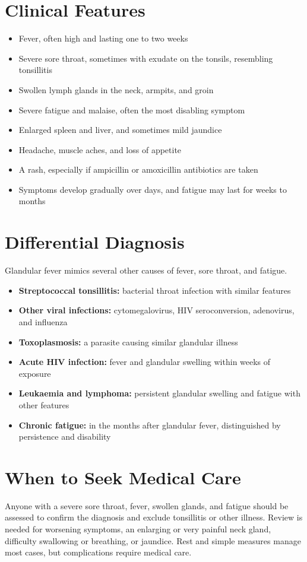\section*{Clinical Features}
\begin{itemize}
    \item Fever, often high and lasting one to two weeks
    \item Severe sore throat, sometimes with exudate on the tonsils, resembling tonsillitis
    \item Swollen lymph glands in the neck, armpits, and groin
    \item Severe fatigue and malaise, often the most disabling symptom
    \item Enlarged spleen and liver, and sometimes mild jaundice
    \item Headache, muscle aches, and loss of appetite
    \item A rash, especially if ampicillin or amoxicillin antibiotics are taken
    \item Symptoms develop gradually over days, and fatigue may last for weeks to months
\end{itemize}

\section*{Differential Diagnosis}
Glandular fever mimics several other causes of fever, sore throat, and fatigue.
\begin{itemize}
    \item \textbf{Streptococcal tonsillitis:} bacterial throat infection with similar features
    \item \textbf{Other viral infections:} cytomegalovirus, HIV seroconversion, adenovirus, and influenza
    \item \textbf{Toxoplasmosis:} a parasite causing similar glandular illness
    \item \textbf{Acute HIV infection:} fever and glandular swelling within weeks of exposure
    \item \textbf{Leukaemia and lymphoma:} persistent glandular swelling and fatigue with other features
    \item \textbf{Chronic fatigue:} in the months after glandular fever, distinguished by persistence and disability
\end{itemize}

\section*{When to Seek Medical Care}
Anyone with a severe sore throat, fever, swollen glands, and fatigue should be assessed to confirm the diagnosis and exclude tonsillitis or other illness. Review is needed for worsening symptoms, an enlarging or very painful neck gland, difficulty swallowing or breathing, or jaundice. Rest and simple measures manage most cases, but complications require medical care.

